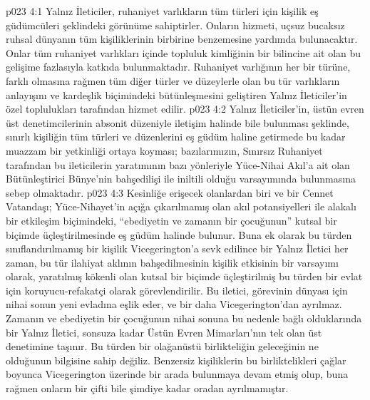 \vs p023 4:1 Yalnız İleticiler, ruhaniyet varlıkların tüm türleri için kişilik eş güdümcüleri şeklindeki görünüme sahiptirler. Onların hizmeti, uçsuz bucaksız ruhsal dünyanın tüm kişiliklerinin birbirine benzemesine yardımda bulunacaktır. Onlar tüm ruhaniyet varlıkları içinde topluluk kimliğinin bir bilincine ait olan bu gelişime fazlasıyla katkıda bulunmaktadır. Ruhaniyet varlığının her bir türüne, farklı olmasına rağmen tüm diğer türler ve düzeylerle olan bu tür varlıkların anlayışını ve kardeşlik biçimindeki bütünleşmesini geliştiren Yalnız İleticiler’in özel toplulukları tarafından hizmet edilir.
\vs p023 4:2 Yalnız İleticiler’in, üstün evren üst denetimcilerinin absonit düzeniyle iletişim halinde bile bulunması şeklinde, sınırlı kişiliğin tüm türleri ve düzenlerini eş güdüm haline getirmede bu kadar muazzam bir yetkinliği ortaya koyması; bazılarımızın, Sınırsız Ruhaniyet tarafından bu ileticilerin yaratımının bazı yönleriyle Yüce\hyp{}Nihai Akıl’a ait olan Bütünleştirici Bünye’nin bahşedilişi ile iniltili olduğu varsayımında bulunmasına sebep olmaktadır.
\vs p023 4:3 Kesinliğe erişecek olanlardan biri ve bir Cennet Vatandaşı; Yüce\hyp{}Nihayet’in açığa çıkarılmamış olan akıl potansiyelleri ile alakalı bir etkileşim biçimindeki, “ebediyetin ve zamanın bir çocuğunun” kutsal bir biçimde üçleştirilmesinde eş güdüm halinde bulunur. Buna ek olarak bu türden sınıflandırılmamış bir kişilik Vicegerington’a sevk edilince bir Yalnız İletici her zaman, bu tür ilahiyat aklının bahşedilmesinin kişilik etkisinin bir varsayımı olarak, yaratılmış kökenli olan kutsal bir biçimde üçleştirilmiş bu türden bir evlat için koruyucu\hyp{}refakatçi olarak görevlendirilir. Bu iletici, görevinin dünyası için nihai sonun yeni evladına eşlik eder, ve bir daha Vicegerington’dan ayrılmaz. Zamanın ve ebediyetin bir çocuğunun nihai sonuna bu nedenle bağlı olduklarında bir Yalnız İletici, sonsuza kadar Üstün Evren Mimarları’nın tek olan üst denetimine taşınır. Bu türden bir olağanüstü birlikteliğin geleceğinin ne olduğunun bilgisine sahip değiliz. Benzersiz kişiliklerin bu birliktelikleri çağlar boyunca Vicegerington üzerinde bir arada bulunmaya devam etmiş olup, buna rağmen onların bir çifti bile şimdiye kadar oradan ayrılmamıştır.
